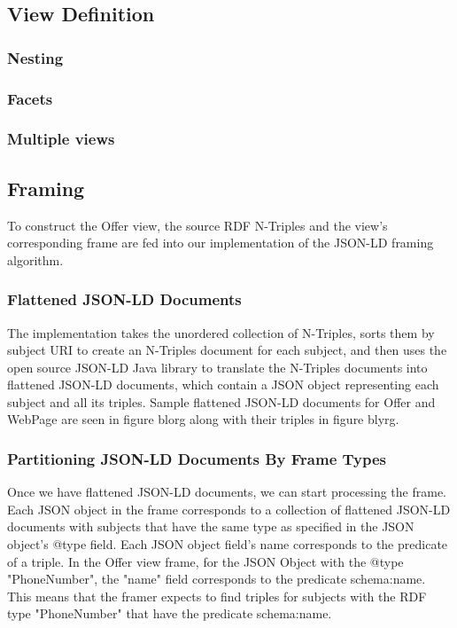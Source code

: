 \subsection{View Definition}
\subsubsection{Nesting}
\subsubsection{Facets}
\subsubsection{Multiple views}

\subsection{Framing}
To construct the Offer view, the source RDF N-Triples and the view's corresponding frame are fed into our implementation of the JSON-LD framing algorithm.  

\subsubsection{Flattened JSON-LD Documents}
The implementation takes the unordered collection of N-Triples, sorts them by subject URI to create an N-Triples document for each subject, and then uses the open source JSON-LD Java library to translate the N-Triples documents into flattened JSON-LD documents, which contain a JSON object representing each subject and all its triples.
Sample flattened JSON-LD documents for Offer and WebPage are seen in figure blorg along with their triples in figure blyrg.

\subsubsection{Partitioning JSON-LD Documents By Frame Types}
Once we have flattened JSON-LD documents, we can start processing the frame. 
Each JSON object in the frame corresponds to a collection of flattened JSON-LD documents with subjects that have the same type as specified in the JSON object's @type field.
Each JSON object field's name corresponds to the predicate of a triple.
In the Offer view frame, for the JSON Object with the @type "PhoneNumber", the "name" field corresponds to the predicate schema:name.
This means that the framer expects to find triples for subjects with the RDF type "PhoneNumber" that have the predicate schema:name.

